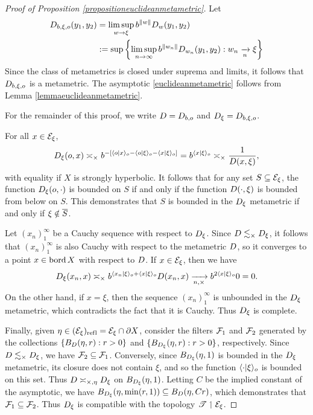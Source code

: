 \begin{proof}[Proof of Proposition \ref{propositioneuclideanmetametric}]
Let
\begin{align*}
D_{b,\xi,o}(y_1,y_2) 
&= \limsup_{w\to\xi}b^{\|w\|}D_w(y_1,y_2)\\ 
&:= \sup\left\{\limsup_{n\to\infty} b^{\|w_n\|}D_{w_n}(y_1,y_2) : w_n \xrightarrow[n]{} \xi\right\}
\end{align*}
Since the class of metametrics is closed under suprema and limits, it follows that $D_{b,\xi,o}$ is a metametric. The asymptotic \eqref{euclideanmetametric} follows from Lemma \ref{lemmaeuclideanmetametric}.

For the remainder of this proof, we write $D = D_{b,o}$ and $D_\xi = D_{b,\xi,o}$.

For all $x\in\mathcal E_\xi$,
\begin{equation}
\label{euclideancomparison}
D_\xi(o,x) \asymp_\times b^{-[\langle o|x\rangle_o - \langle o|\xi\rangle_o - \langle x|\xi\rangle_o]} = b^{\langle x|\xi\rangle_o} \asymp_\times \frac{1}{D(x,\xi)},
\end{equation}
with equality if $X$ is strongly hyperbolic. It follows that for any set $S\subseteq\mathcal E_\xi$, the function $D_\xi(o,\cdot)$ is bounded on $S$ if and only if the function $D(\cdot,\xi)$ is bounded from below on $S$. This demonstrates that $S$ is bounded in the $D_\xi$ metametric if and only if $\xi\notin\overline S$.


Let $(x_n)_1^\infty$ be a Cauchy sequence with respect to $D_\xi$. Since $D \lesssim_\times D_\xi$, it follows that $(x_n)_1^\infty$ is also Cauchy with respect to the metametric $D$, so it converges to a point $x\in\operatorname{bord} X$ with respect to $D$. If $x\in\mathcal E_\xi$, then we have
\[
D_\xi(x_n,x) \asymp_\times b^{\langle x_n | \xi\rangle_o + \langle x | \xi\rangle_o} D(x_n,x) \xrightarrow[n,\times]{} b^{2\langle x | \xi\rangle_o} 0 = 0.
\]
On the other hand, if $x = \xi$, then the sequence $(x_n)_1^\infty$ is unbounded in the $D_\xi$ metametric, which contradicts the fact that it is Cauchy. Thus $D_\xi$ is complete.

Finally, given $\eta\in (\mathcal E_\xi)_{\mathrm{ref \hspace{0 in} l}} = \mathcal E_\xi\cap\partial X$, consider the filters $\mathcal F_1$ and $\mathcal F_2$ generated by the collections $\{B_{D}(\eta,r) : r > 0\}$ and $\{B_{D_\xi}(\eta,r) : r > 0\}$, respectively. Since $D \lesssim_\times D_\xi$, we have $\mathcal F_2\subseteq\mathcal F_1$. Conversely, since $B_{D_\xi}(\eta,1)$ is bounded in the $D_\xi$ metametric, its closure does not contain $\xi$, and so the function $\langle \cdot | \xi\rangle_o$ is bounded on this set. Thus $D \asymp_{\times,\eta} D_\xi$ on $B_{D_\xi}(\eta,1)$. Letting $C$ be the implied constant of the asymptotic, we have $B_{D_\xi}(\eta,\min(r,1)) \subseteq B_{D}(\eta,Cr)$, which demonstrates that $\mathcal F_1\subseteq\mathcal F_2$. Thus $D_\xi$ is compatible with the topology $\mathscr T\upharpoonleft\mathcal E_\xi$.
\end{proof}

